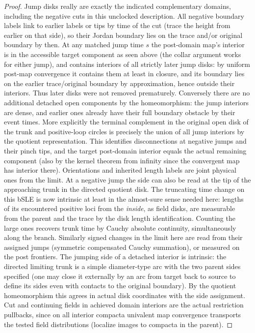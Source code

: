 \begin{proof}
Jump disks really are exactly the indicated complementary domains, including the negative cuts in this unclocked description.
All negative boundary labels link to earlier labels or tips by time of the cut (trace the height from earlier on that side), so their Jordan boundary lies on the trace and/or original boundary by then.
At any matched jump time \(s\) the post-domain map's interior is in the accessible target component as seen above (the collar argument works for either jump), and contains interiors of all strictly later jump disks: by uniform post-map convergence it contains them at least in closure, and its boundary lies on the earlier trace/original boundary by approximation, hence outside their interiors.
Thus later disks were not removed prematurely.
Conversely there are no additional detached open components by the homeomorphism: the jump interiors are dense, and earlier ones already have their full boundary obstacle by their event times.
More explicitly the terminal complement in the original open disk of the trunk and positive-loop circles is precisely the union of all jump interiors by the quotient representation.
This identifies disconnections at negative jumps and their pinch tips, and the target post-domain interior equals the actual remaining component (also by the kernel theorem from infinity since the convergent map has interior there).
Orientations and inherited length labels are joint physical ones from the limit.
At a negative jump the side can also be read at the tip of the approaching trunk in the directed quotient disk.
The truncating time change on this bSLE is now intrinsic at least in the almost-sure sense needed here: lengths of its encountered positive loci from the \emph{inside}, as field disks, are measurable from the parent and the trace by the disk length identification.
Counting the large ones recovers trunk time by Cauchy absolute continuity, simultaneously along the branch.
Similarly signed changes in the limit here are read from their assigned jumps (symmetric compensated Cauchy summation), or measured on the post frontiers.
The jumping side of a detached interior is intrinsic: the directed limiting trunk is a simple diameter-type arc with the two parent sides specified (one may close it externally by an arc from target back to source to define its sides even with contacts to the original boundary).
By the quotient homeomorphism this agrees in actual disk coordinates with the side assignment.
Cut and continuing fields in achieved domain interiors are the actual restriction pullbacks, since on all interior compacta univalent map convergence transports the tested field distributions (localize images to compacta in the parent).

\end{proof}
